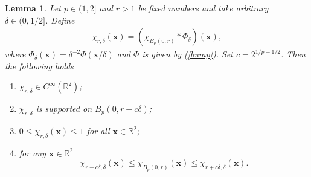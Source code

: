 \documentclass{amsart}
\newtheorem{lem}[theorem]{Lemma}
\numberwithin{equation}{section}
\begin{document}
\begin{lem}
\label{smoothCharLemma}
Let $p\in(1,2]$ and $r>1$ be fixed numbers and take arbitrary $\delta\in(0,1/2]$. Define
\begin{eqnarray}
    \label{smoothCharacteristic}
    \chi_{r,\delta}(\boldsymbol{x})=(\chi_{B_p(0,r)}*\Phi_\delta)(\boldsymbol{x}),
\end{eqnarray}
where $\Phi_\delta(\boldsymbol{x})=\delta^{-2}\Phi(\boldsymbol{x}/\delta)$ and $\Phi$ is given by (\ref{bump}). Set $c=2^{1/p-1/2}$. Then the following holds
\begin{enumerate}
    \item\label{1stItem} $\chi_{r,\delta}\in C^\infty(\mathbb{R}^2)$;
    \item\label{2ndItem} $\chi_{r,\delta}$ is supported on $B_p(0,r+c\delta)$;
    \item\label{3rdItem} $0\le \chi_{r,\delta}(\boldsymbol{x})\le 1$ for all $\boldsymbol{x}\in\mathbb{R}^2$;
    \item\label{4thItem} for any $\boldsymbol{x}\in\mathbb{R}^2$
    \begin{equation}
    \chi_{r-c\delta,\delta}(\boldsymbol{x})\le \chi_{B_p(0,r)}(\boldsymbol{x})\le \chi_{r+c\delta,\delta}(\boldsymbol{x}).
    \end{equation}
\end{enumerate}
\end{lem}
\end{document}
